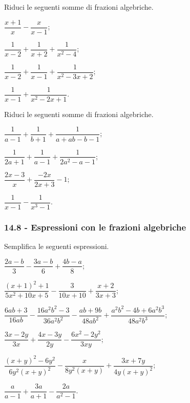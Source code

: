 \begin{esercizio}[\Ast]
\label{ese:14.26}
Riduci le seguenti somme di frazioni algebriche.
\begin{multicols}{2}
\begin{enumeratea}
 \item $\dfrac{x+1}{x}-\dfrac{x}{x-1}$;
 \item $\dfrac{1}{x-2}+\dfrac{1}{x+2}+\dfrac{1}{x^{{2}}-4}$;
 \item $\dfrac{1}{x-2}+\dfrac{1}{x-1}+\dfrac{1}{x^{{2}}-3x+2}$;
 \item $\dfrac{1}{x-1}+\dfrac{1}{x^{2}-2x+1}$.
\end{enumeratea}
\end{multicols}
\end{esercizio}

\begin{esercizio}[\Ast]
\label{ese:14.27}
Riduci le seguenti somme di frazioni algebriche.
\begin{multicols}{2}
\begin{enumeratea}
 \item $\dfrac{1}{a-1}+\dfrac{1}{b+1}+\dfrac{1}{a+ab-b-1}$;
 \item $\dfrac{1}{2a+1}+\dfrac{1}{a-1}+\dfrac{1}{2a^{2}-a-1}$;
 \item $\dfrac{2x-3}{x}+\dfrac{-2x}{2x+3}-1$;
 \item $\dfrac{1}{x-1}-\dfrac{1}{x^{3}-1}$.
\end{enumeratea}
\end{multicols}
\end{esercizio}

\subsubsection*{14.8 - Espressioni con le frazioni algebriche}

\begin{esercizio}[\Ast]
\label{ese:14.28}
Semplifica le seguenti espressioni.
\begin{enumeratea}
 \item $\dfrac{2a-b}{3}-\dfrac{3a-b}{6}+\dfrac{4b-a}{8}$;
 \item $\dfrac{(x+1)^{2}+1}{5x^{2}+10x+5}-\dfrac{3}{10x+10}+\dfrac{x+2}{3x+3}$;
 \item $\dfrac{6ab+3}{16ab}-\dfrac{16a^{2}b^{2}-3}{36a^{2}b^{2}}-\dfrac{ab+9b}{48ab^{2}}+\dfrac{a^{2}b^{2}-4b+6a^{2}b^{3}}{48a^{2}b^{3}}$;
 \item $\dfrac{3x-2y}{3x}+\dfrac{4x-3y}{2y}-\dfrac{6x^{2}-2y^{2}}{3xy}$;
 \item $\dfrac{(x+y)^{2}-6y^{2}}{6y^{2}(x+y)^{2}}-\dfrac{x}{8y^{2}(x+y)}+\dfrac{3x+7y}{4y(x+y)^{2}}$;
 \item $\dfrac{a}{a-1}+\dfrac{3a}{a+1}-\dfrac{2a}{a^{2}-1}$.
\end{enumeratea}
\end{esercizio}
\pagebreak

